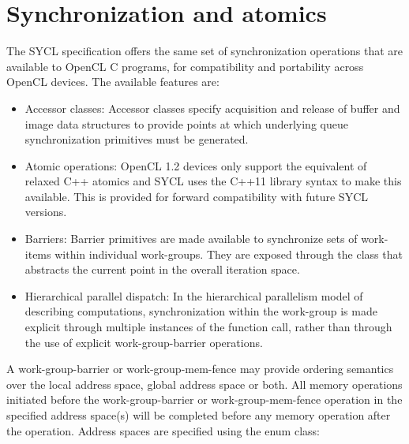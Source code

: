 \section{Synchronization and atomics}


The SYCL specification offers the same set of synchronization
operations that are available to OpenCL C programs, for compatibility
and portability across OpenCL devices. The available features are:
\begin{itemize}
  \item
    Accessor classes: Accessor classes specify acquisition and release
    of buffer and image data structures to provide points at which
    underlying queue synchronization primitives must be generated.
  \item
    Atomic operations: OpenCL 1.2 devices only support the equivalent
    of relaxed C++ atomics and SYCL uses the C++11 library syntax to
    make this available. This is provided for forward compatibility
    with future SYCL versions.
  \item
    Barriers: Barrier primitives are made available to synchronize
    sets of work-items within individual work-groups. They are exposed
    through the  class that abstracts the current
    point in the overall iteration space.
  \item
    Hierarchical parallel dispatch: In the hierarchical parallelism
    model of describing computations, synchronization within the
    work-group is made explicit through multiple instances of the
     function call, rather than
    through the use of explicit \gls{work-group-barrier} operations.
\end{itemize}

A \gls{work-group-barrier} or \gls{work-group-mem-fence} may provide ordering semantics over the local address space, global address space or both. All memory operations initiated before the \gls{work-group-barrier} or \gls{work-group-mem-fence} operation in the specified address space(s) will be completed before any memory operation after the operation. Address spaces are specified using the  enum class:


